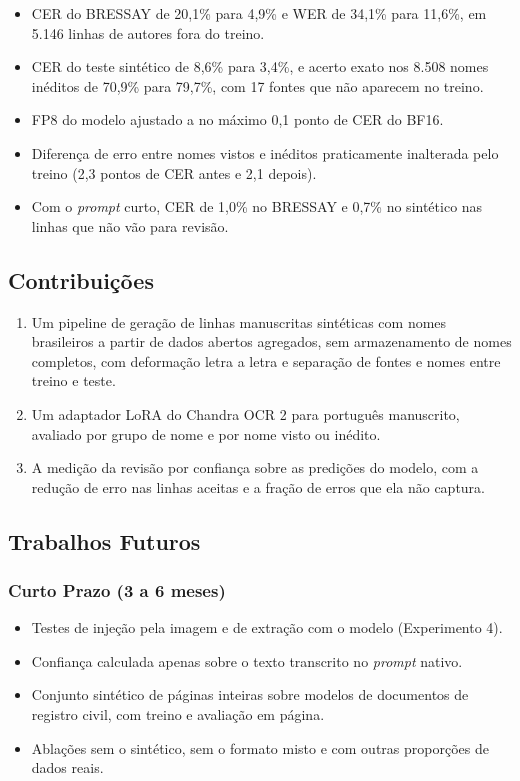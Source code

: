 \documentclass[12pt,a4paper]{article}
\begin{document}
\begin{itemize}
    \item CER do BRESSAY de 20,1\% para 4,9\% e WER de 34,1\% para 11,6\%, em 5.146 linhas de autores fora do treino.
    \item CER do teste sintético de 8,6\% para 3,4\%, e acerto exato nos 8.508 nomes inéditos de 70,9\% para 79,7\%, com 17 fontes que não aparecem no treino.
    \item FP8 do modelo ajustado a no máximo 0,1 ponto de CER do BF16.
    \item Diferença de erro entre nomes vistos e inéditos praticamente inalterada pelo treino (2,3 pontos de CER antes e 2,1 depois).
    \item Com o \emph{prompt} curto, CER de 1,0\% no BRESSAY e 0,7\% no sintético nas linhas que não vão para revisão.
\end{itemize}

\subsection{Contribuições}

\begin{enumerate}
    \item Um pipeline de geração de linhas manuscritas sintéticas com nomes brasileiros a partir de dados abertos agregados, sem armazenamento de nomes completos, com deformação letra a letra e separação de fontes e nomes entre treino e teste.
    \item Um adaptador LoRA do Chandra OCR 2 para português manuscrito, avaliado por grupo de nome e por nome visto ou inédito.
    \item A medição da revisão por confiança sobre as predições do modelo, com a redução de erro nas linhas aceitas e a fração de erros que ela não captura.
\end{enumerate}

\subsection{Trabalhos Futuros}

\subsubsection{Curto Prazo (3 a 6 meses)}
\begin{itemize}
    \item Testes de injeção pela imagem e de extração com o modelo (Experimento 4).
    \item Confiança calculada apenas sobre o texto transcrito no \emph{prompt} nativo.
    \item Conjunto sintético de páginas inteiras sobre modelos de documentos de registro civil, com treino e avaliação em página.
    \item Ablações sem o sintético, sem o formato misto e com outras proporções de dados reais.
\end{itemize}
\end{document}
